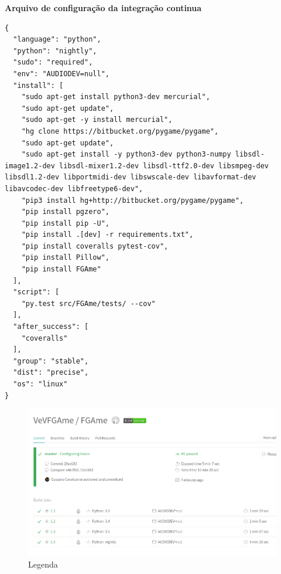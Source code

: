 \pagestyle{empty}


{\LARGE \textbf{Arquivo de configuração da integração continua}}

\begin{anexosenv}
\begin{lstlisting}
{
  "language": "python",
  "python": "nightly",
  "sudo": "required",
  "env": "AUDIODEV=null",
  "install": [
    "sudo apt-get install python3-dev mercurial",
    "sudo apt-get update",
    "sudo apt-get -y install mercurial",
    "hg clone https://bitbucket.org/pygame/pygame",
    "sudo apt-get update",
    "sudo apt-get install -y python3-dev python3-numpy libsdl-image1.2-dev libsdl-mixer1.2-dev libsdl-ttf2.0-dev libsmpeg-dev libsdl1.2-dev libportmidi-dev libswscale-dev libavformat-dev libavcodec-dev libfreetype6-dev",
    "pip3 install hg+http://bitbucket.org/pygame/pygame",
    "pip install pgzero",
    "pip install pip -U",
    "pip install .[dev] -r requirements.txt",
    "pip install coveralls pytest-cov",
    "pip install Pillow",
    "pip install FGAme"
  ],
  "script": [
    "py.test src/FGAme/tests/ --cov"
  ],
  "after_success": [
    "coveralls"
  ],
  "group": "stable",
  "dist": "precise",
  "os": "linux"
}
\end{lstlisting}

\begin{figure}[!htb]
\centering
\includegraphics[scale=0.6]{figuras/build}
\caption{Legenda}
\label{Rotulo}
\end{figure}

\end{anexosenv}